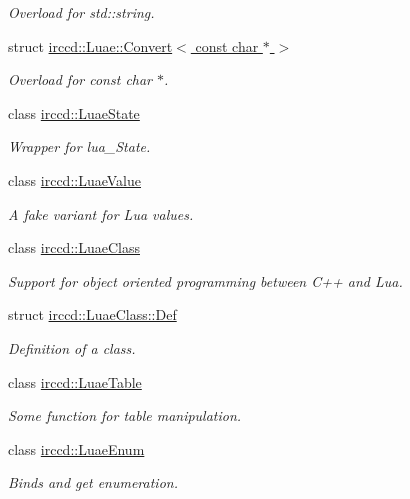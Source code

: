 \begin{DoxyCompactItemize}
\begin{DoxyCompactList}\small\item\em Overload for std\-::string. \end{DoxyCompactList}\item 
struct \hyperlink{a00009}{irccd\-::\-Luae\-::\-Convert$<$ const char $\ast$ $>$}
\begin{DoxyCompactList}\small\item\em Overload for const char $\ast$. \end{DoxyCompactList}\item 
class \hyperlink{a00043}{irccd\-::\-Luae\-State}
\begin{DoxyCompactList}\small\item\em Wrapper for lua\-\_\-\-State. \end{DoxyCompactList}\item 
class \hyperlink{a00045}{irccd\-::\-Luae\-Value}
\begin{DoxyCompactList}\small\item\em A fake variant for Lua values. \end{DoxyCompactList}\item 
class \hyperlink{a00041}{irccd\-::\-Luae\-Class}
\begin{DoxyCompactList}\small\item\em Support for object oriented programming between C++ and Lua. \end{DoxyCompactList}\item 
struct \hyperlink{a00024}{irccd\-::\-Luae\-Class\-::\-Def}
\begin{DoxyCompactList}\small\item\em Definition of a class. \end{DoxyCompactList}\item 
class \hyperlink{a00044}{irccd\-::\-Luae\-Table}
\begin{DoxyCompactList}\small\item\em Some function for table manipulation. \end{DoxyCompactList}\item 
class \hyperlink{a00042}{irccd\-::\-Luae\-Enum}
\begin{DoxyCompactList}\small\item\em Binds and get enumeration. \end{DoxyCompactList}\end{DoxyCompactItemize}
